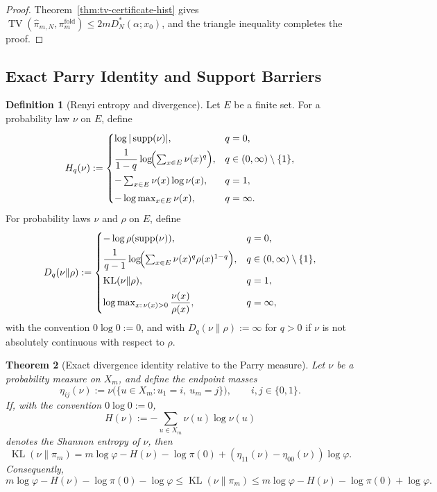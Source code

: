 \documentclass[11pt,letterpaper]{article}
\numberwithin{equation}{section}
\theoremstyle{plain}
\newtheorem{theorem}{Theorem}[section]
\theoremstyle{definition}
\newtheorem{definition}[theorem]{Definition}
\theoremstyle{remark}
\DeclareMathOperator{\TV}{TV}
\DeclareMathOperator{\KL}{KL}
\DeclareMathOperator{\supp}{supp}
\begin{document}
\begin{proof}
Theorem~\ref{thm:tv-certificate-hist} gives
$\TV(\hat\pi_{m,N},\pi_m^{\mathrm{fold}})\le 2mD_N^*(\alpha;x_0)$, and the
triangle inequality completes the proof.
\end{proof}

\subsection{Exact Parry Identity and Support Barriers}

\begin{definition}[Renyi entropy and divergence]\label{def:renyi-entropy-divergence}
Let \(E\) be a finite set. For a probability law \(\nu\) on \(E\), define
\[
H_q(\nu):=
\begin{cases}
\log |\supp(\nu)|,
& q=0,\\[0.4em]
\dfrac{1}{1-q}\log\!\Bigl(\sum_{x\in E}\nu(x)^q\Bigr),
& q\in(0,\infty)\setminus\{1\},\\[0.8em]
-\sum_{x\in E}\nu(x)\log \nu(x),
& q=1,\\[0.4em]
-\log \max_{x\in E}\nu(x),
& q=\infty.
\end{cases}
\]
For probability laws \(\nu\) and \(\rho\) on \(E\), define
\[
D_q(\nu\|\rho):=
\begin{cases}
-\log \rho(\supp(\nu)),
& q=0,\\[0.4em]
\dfrac{1}{q-1}\log\!\Bigl(\sum_{x\in E}\nu(x)^q\rho(x)^{1-q}\Bigr),
& q\in(0,\infty)\setminus\{1\},\\[0.8em]
\KL(\nu\|\rho),
& q=1,\\[0.4em]
\log \max_{x:\,\nu(x)>0}\dfrac{\nu(x)}{\rho(x)},
& q=\infty,
\end{cases}
\]
with the convention \(0\log 0:=0\), and with \(D_q(\nu\|\rho):=\infty\) for
\(q>0\) if \(\nu\) is not absolutely continuous with respect to \(\rho\).
\end{definition}

\begin{theorem}[Exact divergence identity relative to the Parry measure]\label{thm:parry-kl-identity}
Let \(\nu\) be a probability measure on \(X_m\), and define the endpoint masses
\[
\eta_{ij}(\nu):=\nu\bigl(\{u\in X_m:u_1=i,\ u_m=j\}\bigr),
\qquad i,j\in\{0,1\}.
\]
If, with the convention \(0\log 0:=0\),
\[
H(\nu):=-\sum_{u\in X_m}\nu(u)\log \nu(u)
\]
denotes the Shannon entropy of \(\nu\), then
\[
\KL(\nu\|\pi_m)
=
m\log\varphi-H(\nu)-\log\pi(0)
{}+(\eta_{11}(\nu)-\eta_{00}(\nu))\log\varphi.
\]
Consequently,
\[
m\log\varphi-H(\nu)-\log\pi(0)-\log\varphi
\le
\KL(\nu\|\pi_m)
\le
m\log\varphi-H(\nu)-\log\pi(0)+\log\varphi.
\]
\end{theorem}
\end{document}
